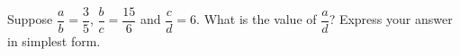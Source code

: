Suppose $\dfrac {a}{b}=\dfrac{3}{5}$, $\dfrac {b}{c}=\dfrac{15}{6}$ and $\dfrac {c}{d}=6$. What is the value of $\dfrac {a}{d}$? Express your answer in simplest form.
